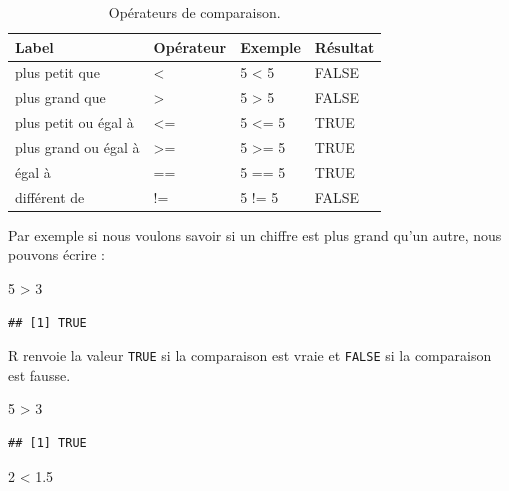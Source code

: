 \documentclass[twoside,symmetric]{book}
\newenvironment{Shaded}{}{}
\newcommand{\DecValTok}[1]{#1}
\newcommand{\FloatTok}[1]{#1}
\newcommand{\OperatorTok}[1]{#1}
\newcommand{\StringTok}[1]{#1}
\begin{document}
\begin{table}

\caption{\label{tab:tabOpCom}Opérateurs de comparaison.\label{tab:tabOpCom}}
\centering
\begin{tabular}[t]{l|l|l|l}
\hline
Label & Opérateur & Exemple & Résultat\\
\hline
plus petit que & < & 5 < 5 & FALSE\\
\hline
plus grand que & > & 5 > 5 & FALSE\\
\hline
plus petit ou égal à & <= & 5 <= 5 & TRUE\\
\hline
plus grand ou égal à & >= & 5 >= 5 & TRUE\\
\hline
égal à & == & 5 == 5 & TRUE\\
\hline
différent de & != & 5 != 5 & FALSE\\
\hline
\end{tabular}
\end{table}

Par exemple si nous voulons savoir si un chiffre est plus grand qu'un autre, nous pouvons écrire :

\begin{Shaded}
\begin{Highlighting}[]
\DecValTok{5} \OperatorTok{>}\StringTok{ }\DecValTok{3} 
\end{Highlighting}
\end{Shaded}

\begin{verbatim}
## [1] TRUE
\end{verbatim}

R renvoie la valeur \texttt{TRUE} si la comparaison est vraie et \texttt{FALSE} si la comparaison est fausse.

\begin{Shaded}
\begin{Highlighting}[]
\DecValTok{5} \OperatorTok{>}\StringTok{ }\DecValTok{3}
\end{Highlighting}
\end{Shaded}

\begin{verbatim}
## [1] TRUE
\end{verbatim}

\begin{Shaded}
\begin{Highlighting}[]
\DecValTok{2} \OperatorTok{<}\StringTok{ }\FloatTok{1.5}
\end{Highlighting}
\end{Shaded}
\end{document}
